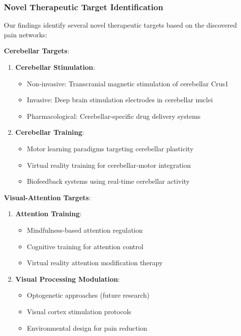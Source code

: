 \subsubsection{Novel Therapeutic Target Identification}

Our findings identify several novel therapeutic targets based on the discovered pain networks:

\textbf{Cerebellar Targets}:

\begin{enumerate}
\item \textbf{Cerebellar Stimulation}:
   \begin{itemize}
   \item Non-invasive: Transcranial magnetic stimulation of cerebellar Crus1
   \item Invasive: Deep brain stimulation electrodes in cerebellar nuclei
   \item Pharmacological: Cerebellar-specific drug delivery systems
   \end{itemize}

\item \textbf{Cerebellar Training}:
   \begin{itemize}
   \item Motor learning paradigms targeting cerebellar plasticity
   \item Virtual reality training for cerebellar-motor integration
   \item Biofeedback systems using real-time cerebellar activity
   \end{itemize}
\end{enumerate}

\textbf{Visual-Attention Targets}:

\begin{enumerate}
\item \textbf{Attention Training}:
   \begin{itemize}
   \item Mindfulness-based attention regulation
   \item Cognitive training for attention control
   \item Virtual reality attention modification therapy
   \end{itemize}

\item \textbf{Visual Processing Modulation}:
   \begin{itemize}
   \item Optogenetic approaches (future research)
   \item Visual cortex stimulation protocols
   \item Environmental design for pain reduction
   \end{itemize}
\end{enumerate}

